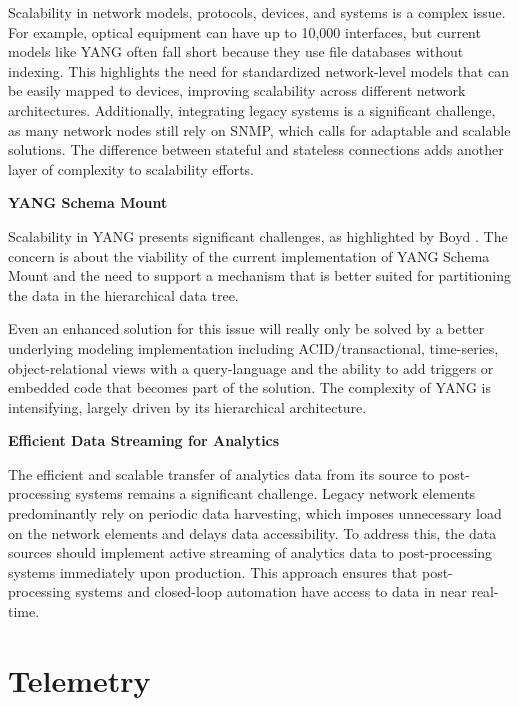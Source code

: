 \documentclass[10pt,sigconf]{iabart}
\begin{document}
Scalability in network models, protocols, devices, and systems is a complex issue. For example, optical equipment can have up to 10,000 interfaces, but current models like YANG often fall short because they use file databases without indexing. This highlights the need for standardized network-level models that can be easily mapped to devices, improving scalability across different network architectures. Additionally, integrating legacy systems is a significant challenge, as many network nodes still rely on SNMP, which calls for adaptable and scalable solutions. The difference between stateful and stateless connections adds another layer of complexity to scalability efforts.
 

\textbf{YANG Schema Mount}

Scalability in YANG presents significant challenges, as highlighted by Boyd \cite{boyd2023scalable}. The concern is about the viability of the current implementation of YANG Schema Mount \cite{RFC8528} and the need to support a mechanism that is better suited for partitioning the data in the hierarchical data tree.

Even an enhanced solution for this issue will really only be solved by a better underlying modeling implementation including ACID/transactional, time-series, object-relational views with a query-language and the ability to add triggers or embedded code that becomes part of the solution. The complexity of YANG is intensifying, largely driven by its hierarchical architecture.

\textbf{Efficient Data Streaming for Analytics}

The efficient and scalable transfer of analytics data from its source to post-processing systems remains a significant challenge. Legacy network elements predominantly rely on periodic data harvesting, which imposes unnecessary load on the network elements and delays data accessibility. To address this, the data sources should implement active streaming of analytics data to post-processing systems immediately upon production. This approach ensures that post-processing systems and closed-loop automation have access to data in near real-time.


\section{Telemetry} \label{telemetry}


\end{document}
